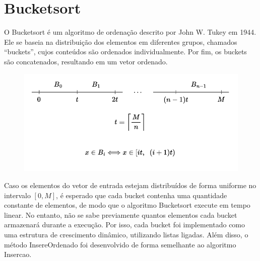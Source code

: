 \section{Bucketsort}
O Bucketsort é um algoritmo de ordenação descrito por John W. Tukey em 1944. Ele se baseia na distribuição dos elementos em diferentes grupos, chamados ``buckets'', cujos conteúdos são ordenados individualmente. Por fim, os buckets são concatenados, resultando em um vetor ordenado.

\begin{figure}[H]
\centering
\includegraphics[scale=1.0]{figuras/pdf/buckets.pdf}
\end{figure}

Caso os elementos do vetor de entrada estejam distribuídos de forma uniforme no intervalo $[0, M]$, é esperado que cada bucket contenha uma quantidade constante de elementos, de modo que o algoritmo Bucketsort execute em tempo linear. No entanto, não se sabe previamente quantos elementos cada bucket armazenará durante a execução. Por isso, cada bucket foi implementado como uma estrutura de crescimento dinâmico, utilizando listas ligadas. Além disso, o método InsereOrdenado foi desenvolvido de forma semelhante ao algoritmo Insercao.


